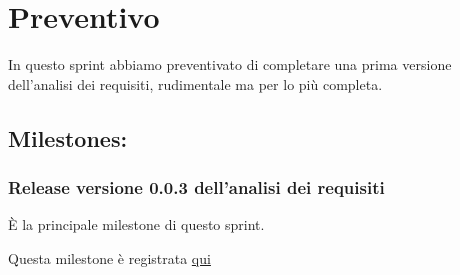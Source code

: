 \section{Preventivo}

In questo sprint abbiamo preventivato di completare una prima versione dell'analisi dei requisiti, rudimentale ma per lo più completa.

\subsection{Milestones:}  
\subsubsection{Release versione 0.0.3 dell'analisi dei requisiti}

È la principale milestone di questo sprint.

Questa milestone è registrata \href{https://github.com/SWEasabi/analisi-dei-requisiti/milestone/3}{qui}
